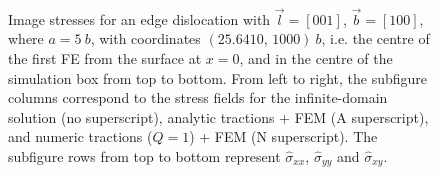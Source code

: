 \documentclass[11pt]{iopart}
\begin{document}
\begin{figure}
    \hspace*{0.2cm}~
    ~
    ~
    \hspace*{-0.2cm}

    \caption{Image stresses for an edge dislocation with $\vec{l} = [0 0 1]$, $\vec{b} = [1 0 0]$, where $a = 5~b$, with coordinates $(25.6410,\, 1000)~b$, i.e. the centre of the first FE from the surface at $x=0$, and in the centre of the simulation box from top to bottom. From left to right, the subfigure columns correspond to the stress fields for the infinite-domain solution (no superscript), analytic tractions + FEM (A superscript), and numeric tractions ($Q = 1$) + FEM (N superscript). The subfigure rows from top to bottom represent $\hat{\sigma}_{xx}$, $\hat{\sigma}_{yy}$ and $\hat{\sigma}_{xy}$.}
    \label{f:head_vs_ana_vs_num_eperp}
\end{figure}
\end{document}
